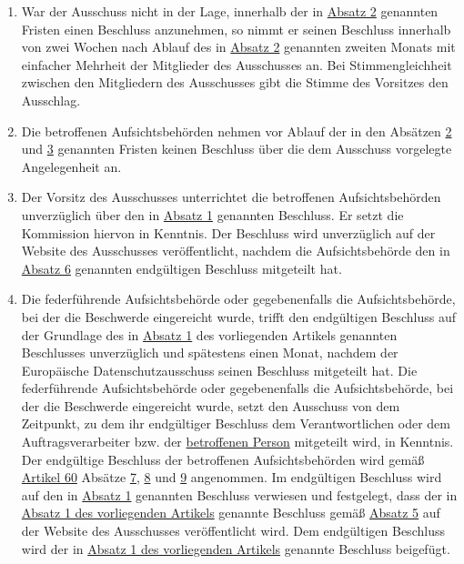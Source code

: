 \begin{enumerate}
  \item War der Ausschuss nicht in der Lage, innerhalb der in \hyperref[itm:65-2]{Absatz 2} genannten Fristen einen
   Beschluss anzunehmen, so nimmt er seinen Beschluss innerhalb von zwei Wochen nach Ablauf des in \hyperref[itm:65-2]
   {Absatz 2} genannten zweiten Monats mit einfacher Mehrheit der Mitglieder des Ausschusses an. Bei Stimmengleichheit
   zwischen den Mitgliedern des Ausschusses gibt die Stimme des Vorsitzes den Ausschlag.
  \label{itm:65-3}

  \item Die betroffenen Aufsichtsbehörden nehmen vor Ablauf der in den Absätzen \hyperref[itm:65-2]{2} und \hyperref
   [itm:65-3]{3} genannten Fristen keinen Beschluss über die dem Ausschuss vorgelegte Angelegenheit an.
  \label{itm:65-4}

  \item Der Vorsitz des Ausschusses unterrichtet die betroffenen Aufsichtsbehörden unverzüglich über den in \hyperref
   [itm:65-1]{Absatz 1} genannten Beschluss. Er setzt die Kommission hiervon in Kenntnis. Der Beschluss wird
   unverzüglich auf der Website des Ausschusses veröffentlicht, nachdem die Aufsichtsbehörde den in \hyperref[itm:65-6]
   {Absatz 6} genannten endgültigen Beschluss mitgeteilt hat.
  \label{itm:65-5}

  \item Die federführende Aufsichtsbehörde oder gegebenenfalls die Aufsichtsbehörde, bei der die Beschwerde eingereicht
   wurde, trifft den endgültigen Beschluss auf der Grundlage des in \hyperref[itm:65-1]{Absatz 1} des vorliegenden
   Artikels genannten Beschlusses unverzüglich und spätestens einen Monat, nachdem der Europäische Datenschutzausschuss
   seinen Beschluss mitgeteilt hat. Die federführende Aufsichtsbehörde oder gegebenenfalls die Aufsichtsbehörde, bei
   der die Beschwerde eingereicht wurde, setzt den Ausschuss von dem Zeitpunkt, zu dem ihr endgültiger Beschluss dem
   Verantwortlichen oder dem Auftragsverarbeiter bzw. der \hyperref[itm:04-1]{betroffenen Person} mitgeteilt wird, in Kenntnis. Der
   endgültige Beschluss der betroffenen Aufsichtsbehörden wird gemäß \hyperref[ch:60]{Artikel 60} Absätze \hyperref
   [itm:60-7]{7}, \hyperref[itm:60-8]{8} und \hyperref[itm:60-9]{9} angenommen. Im endgültigen Beschluss wird auf den
   in \hyperref[itm:65-1]{Absatz 1} genannten Beschluss verwiesen und festgelegt, dass der in \hyperref[itm:65-1]
   {Absatz 1 des vorliegenden Artikels} genannte Beschluss gemäß \hyperref[itm:65-5]{Absatz 5} auf der Website des
   Ausschusses veröffentlicht wird. Dem endgültigen Beschluss wird der in \hyperref[itm:65-1]{Absatz 1 des vorliegenden
   Artikels} genannte Beschluss beigefügt.
  \label{itm:65-6}

\end{enumerate}


